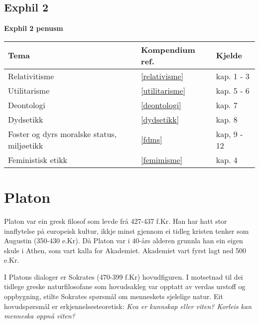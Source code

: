 \documentclass[a4paper]{IEEEtran}
\begin{document}
\subsection{Exphil 2}\bigskip
\begin{center}

\textbf{Exphil 2 penusm}\bigskip

\begin{tabularx}{0.75\textwidth}{| X | X | X |}\hline	  
            Tema
            &
            Kompendium ref.
            &
            Kjelde \\ \hline
            Relativitisme 
            &
            \ref{relativisme}
            &
            kap. 1 - 3
            \\ \hline
            Utilitarisme 
            &
            \ref{utilitarisme}
            &
            kap. 5 - 6
            \\ \hline
            Deontologi
            &
            \ref{deontologi}
            &
            kap. 7
            \\ \hline
            Dydsetikk 
            &
            \ref{dydsetikk}
            &
            kap. 8
            \\ \hline
            Foster og dyrs moralske status, miljøetikk 
            &
            \ref{fdms}
            & 
            kap, 9 - 12
            \\ \hline
            Feministisk etikk 
            &
            \ref{femimisme}
            & 
            kap. 4
            \\ \hline
    \end{tabularx}
\end{center}\clearpage
\twocolumn
\section{Platon}
\label{platon}\bigskip

Platon var ein gresk filosof som levde frå 427-437 f.Kr. Han har hatt stor innflytelse på europeisk kultur, ikkje minst gjennom ei tidleg kristen tenker som Augustin (350-430 e.Kr). Då Platon var i 40-års alderen grunnla han ein eigen skule i Athen, som vart kalla for Akademiet. Akademiet vart fyrst lagt ned 500 e.Kr.\bigskip

I Platons dialoger er Sokrates (470-399 f.Kr) hovudfiguren. I motsetnad til dei tidlege greske naturfilosofane som hovudsakleg var opptatt av verdas urstoff og oppbygning, stilte Sokrates spørsmål om menneskets sjelelige natur. Eit hovudspørsmål er erkjennelsesteoretisk: \textit{Kva er kunnskap eller viten? Korleis kan menneska oppnå viten?}\bigskip
\end{document}
